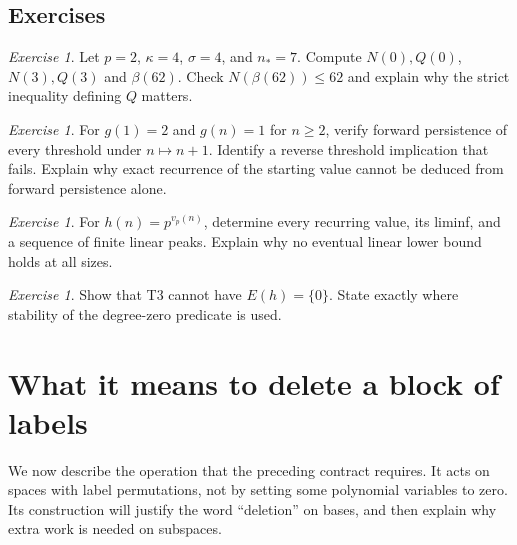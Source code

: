 \documentclass[11pt,a4paper,oneside,openany]{book}
\theoremstyle{definition}\newtheorem{definition}[theorem]{Definition}
\theoremstyle{remark}\newtheorem{remark}[theorem]{Remark}
\newtheorem{exercise}[theorem]{Exercise}
\numberwithin{equation}{chapter}
\begin{document}
\section{Exercises}
\begin{exercise}\label{tx:ex:period-arithmetic}
Let $p=2$, $\kappa=4$, $\sigma=4$, and $n_*=7$. Compute $N(0),Q(0)$,
$N(3),Q(3)$ and $\beta(62)$. Check $N(\beta(62))\le62$ and explain
why the strict inequality defining $Q$ matters.
\end{exercise}
\par\medskip

\begin{exercise}\label{tx:ex:forward-only}
For $g(1)=2$ and $g(n)=1$ for $n\ge2$, verify forward persistence of
every threshold under $n\mapsto n+1$. Identify a reverse threshold
implication that fails. Explain why exact recurrence of the starting
value cannot be deduced from forward persistence alone.
\end{exercise}
\par\medskip

\begin{exercise}\label{tx:ex:valuation-profile}
For $h(n)=p^{v_p(n)}$, determine every recurring value, its liminf,
and a sequence of finite linear peaks. Explain why no eventual linear
lower bound holds at all sizes.
\end{exercise}
\par\medskip

\begin{exercise}\label{tx:ex:zero-T3}
Show that T3 cannot have $E(h)=\{0\}$. State exactly where stability of
the degree-zero predicate is used.
\end{exercise}
\par\medskip


\chapter{What it means to delete a block of labels}
\label{tx:chap:deletion}\label{tx:sec:transfer}
We now describe the operation that the preceding contract requires.
It acts on spaces with label permutations, not by setting some polynomial
variables to zero. Its construction will justify the word ``deletion''
on bases, and then explain why extra work is needed on subspaces.
\end{document}
